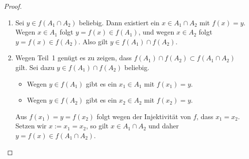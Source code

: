 \begin{proof}
\begin{enumerate}
    \item Sei $y\in f(A_1\cap A_2)$ beliebig. Dann existiert ein $x\in A_1\cap A_2$ mit $f(x)=y$. Wegen $x\in A_1$ folgt $y=f(x)\in f(A_1)$, und wegen $x\in A_2$ folgt $y=f(x)\in f(A_2)$. Also gilt $y\in f(A_1)\cap f(A_2)$.

    \item Wegen Teil~1 genügt es zu zeigen, dass $f(A_1)\cap f(A_2)\subset f(A_1\cap A_2)$ gilt. Sei dazu $y\in f(A_1)\cap f(A_2)$ beliebig.
    \begin{itemize}
        \item Wegen $y\in f(A_1)$ gibt es ein $x_1\in A_1$ mit $f(x_1)=y$.
        \item Wegen $y\in f(A_2)$ gibt es ein $x_2\in A_2$ mit $f(x_2)=y$.
    \end{itemize}
    Aus $f(x_1)=y=f(x_2)$ folgt wegen der Injektivität von $f$, dass $x_1=x_2$. Setzen wir $x:=x_1=x_2$, so gilt $x\in A_1\cap A_2$ und daher $y=f(x)\in f(A_1\cap A_2)$.
\end{enumerate}
\end{proof}
